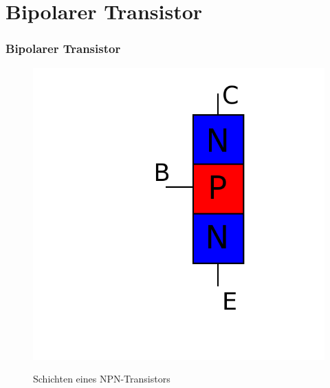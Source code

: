 \section*{Bipolarer Transistor}
\begin{frame}
\frametitle{Bipolarer Transistor}
\begin{minipage}{0.4\textwidth}
	\begin{figure}
      \includegraphics[width=\textwidth,height=.4\textheight,keepaspectratio]{e13/NPN_hlb.png}\\
      \caption{Schichten eines \hbox{NPN-Transistors}}
    \end{figure}
\end{minipage}
\hspace{0.5cm}
\begin{minipage}{0.4\textwidth}
	 \begin{figure}

\end{figure}
\end{minipage}
\end{frame}
